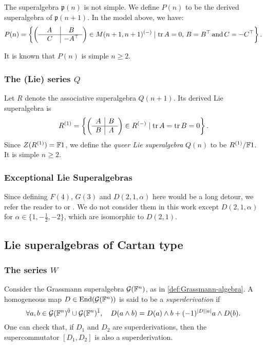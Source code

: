 The superalgebra $\mathfrak{p}(n)$ is not simple.
We define $P(n)$ to be the derived superalgebra of $\mathfrak{p}(n+1)$. 
In the model above, we have:
\[
    P(n) = \left\{
    \left(\begin{array}{c|c}
        A & B\\
        \hline
        \phantom{-}C\phantom{\transp} & -A\transp
    \end{array}\right) \in M(n+1,n+1)^{(-)} \mid \tr A =0, \, B=B\transp \AND C=-C\transp\right\}. 
\]

It is known that $P(n)$ is simple \IFF $n\geq 2$. 

\subsubsection{The (Lie) series $Q$}

Let $R$ denote the associative superalgebra $Q(n+1)$. 
Its derived Lie superalgebra is
\[
    R^{(1)} = \left\{
    \left(\begin{array}{c|c}
        A & B\\
        \hline
        B & A
    \end{array}\right) \in R^{(-)} \mid \operatorname{tr} A = \operatorname{tr} B = 0\right\}. 
\]
Since $Z(R^{(1)}) = \mathbb{F}1$, we define the \emph{queer Lie superalgebra} $Q(n)$ to be $R^{(1)}/\mathbb{F}1$. 
It is simple \IFF $n\geq 2$. 

\subsubsection{Exceptional Lie Superalgebras} 

Since defining $F(4)$, $G(3)$ and $D(2,1, \alpha)$ here would be a long detour, we refer the reader to \cite{artigokac} or \cite{MR1773773}. 
We do not consider them in this work except $D(2, 1, \alpha)$ for $\alpha \in \{1, -\frac{1}{2}, -2 \}$, which are isomorphic to $D(2,1)$. 

\subsection{Lie superalgebras of Cartan type}\label{subsec:Cartan}

\subsubsection{The series $W$}

Consider the Grassmann superalgebra $\mathcal G(\mathbb{F}^n)$, as in \cref{def:Grassmann-algebra}. 
A homogeneous map $D\in \operatorname{End}(\mathcal G(\mathbb{F}^n))$ is said to be a \emph{superderivation} if 
\[
    \forall a,b \in \mathcal G(\mathbb{F}^n)^{\bar0} \cup \mathcal G(\mathbb{F}^n)^{\bar1}, \quad 
    D (a\wedge b)= D (a)\wedge b + (-1)^{|D||a|} a\wedge D (b).
\]
One can check that, if $D_1$ and $D_2$ are superderivations, then the supercommutator $[D_1, D_2]$ is also a superderivation. 

